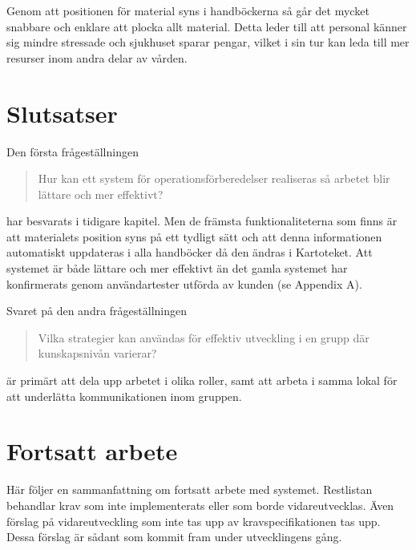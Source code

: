 \documentclass{article}
\begin{document}
Genom att positionen för material syns i handböckerna så går det mycket snabbare och enklare att plocka allt material. Detta leder till att personal känner sig mindre stressade och sjukhuset sparar pengar, vilket i sin tur kan leda till mer resurser inom andra delar av vården.

\newpage
\section{Slutsatser}
Den första frågeställningen
\begin{quote}
Hur kan ett system för operationsförberedelser realiseras så arbetet blir lättare och mer effektivt?
\end{quote}
har besvarats i tidigare kapitel. Men de främsta funktionaliteterna som finns är att materialets position syns på ett tydligt sätt och att denna informationen automatiskt uppdateras i alla handböcker då den ändras i Kartoteket. Att systemet är både lättare och mer effektivt än det gamla systemet har konfirmerats genom användartester utförda av kunden (se Appendix A).

Svaret på den andra frågeställningen
\begin{quote}
Vilka strategier kan användas för effektiv utveckling i en grupp där kunskapsnivån varierar? 
\end{quote}
är primärt att dela upp arbetet i olika roller, samt att arbeta i samma lokal för att underlätta kommunikationen inom gruppen.

\section{Fortsatt arbete}
Här följer en sammanfattning om fortsatt arbete med systemet. Restlistan behandlar krav som inte implementerats eller som borde vidareutvecklas. Även förslag på vidareutveckling som inte tas upp av kravspecifikationen tas upp. Dessa förslag är sådant som kommit fram under utvecklingens gång.
\end{document}
